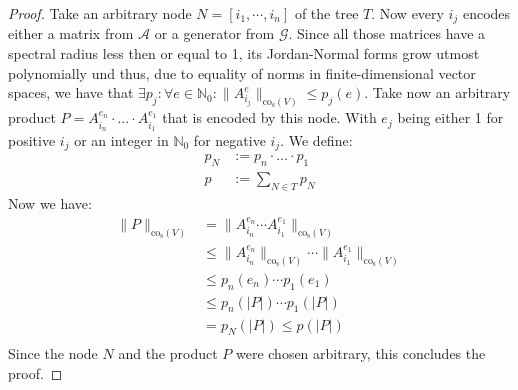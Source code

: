 \begin{proof}
    Take an arbitrary node $N = [i_1, \cdots, i_n]$ of the tree $T$. 
    Now every $i_j$ encodes either a matrix from $\mathcal{A}$ or a generator from $\mathcal{G}$. 
    Since all those matrices have a spectral radius less then or equal to 1, its Jordan-Normal forms grow utmost polynomially und thus, due to equality of norms in finite-dimensional vector spaces, we have that $ \exists p_j: \forall e \in \mathbb{N}_0: \lVert A_{i_j}^{e} \rVert _{\text{co}_{\text{s}}(V)} \le p_j(e)$.
    Take now an arbitrary product $P = A_{i_n}^{e_{n}}\cdot...\cdot A_{i_1}^{e_{1}}$ that is encoded by this node. 
    With $e_j$ being either 1 for positive $i_j$ or an integer in $\mathbb{N}_0$ for negative $i_j$.
    We define: 
    $$
    \begin{aligned}
    p_N & := p_{n} \cdot ... \cdot p_{1} \\
    p & := \sum \limits_{N \in T} p_N
    \end{aligned}
    $$
    Now we have: 
    $$
    \begin{aligned}
    \lVert P \rVert _{\text{co}_{\text{s}}(V)} & = \lVert A_{i_n}^{e_{n}} \cdots A_{i_1}^{e_{1}} \rVert _{\text{co}_{\text{s}}(V)} \\
    & \leq \lVert A_{i_n}^{e_{n}} \rVert _{\text{co}_{\text{s}}(V)} \cdots \lVert A_{i_1}^{e_{1}} \rVert _{\text{co}_{\text{s}}(V)} \\
    & \leq p_{n}(e_n) \cdots p_{1}(e_1) \\
    & \leq p_{n}(\lvert P \rvert) \cdots p_{1}(\lvert P \rvert) \\
    & = p_N(\lvert P \rvert) \leq p(\lvert P \rvert) \\
    \end{aligned}
    $$
    Since the node $N$ and the product $P$ were chosen arbitrary, this concludes the proof. 
\end{proof}

